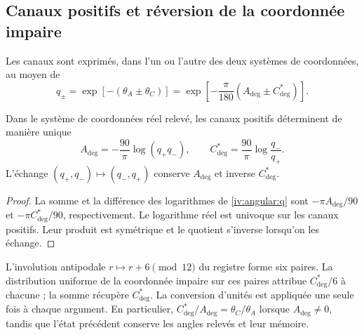 \subsection{Canaux positifs et réversion de la coordonnée impaire
}
\label{iv:angular:canales}

Les canaux sont exprimés, dans l’un ou l’autre des deux systèmes de coordonnées, au moyen de
\begin{equation}
 q_\pm=\exp[-(\theta_A\pm\theta_C)]
 =\exp\!\left[-\frac{\pi}{180}
                   (A_{\deg}\pm C^*_{\deg})\right].
 \label{iv:angular:q}
\end{equation}

\begin{proposition}
\label{iv:angular:inversion}
Dans le système de coordonnées réel relevé, les canaux positifs déterminent
de manière unique
\begin{equation}
 A_{\deg}=-\frac{90}{\pi}\log(q_+q_-),\qquad
 C^*_{\deg}=\frac{90}{\pi}\log\frac{q_-}{q_+}.
 \label{iv:angular:recuperacion}
\end{equation}
L'échange \((q_+,q_-)\mapsto(q_-,q_+)\) conserve
\(A_{\deg}\) et inverse \(C^*_{\deg}\).
\end{proposition}
\begin{proof}
La somme et la différence des logarithmes de
\eqref{iv:angular:q} sont \(-\pi A_{\deg}/90\) et
\(-\pi C^*_{\deg}/90\), respectivement. Le logarithme réel
est univoque sur les canaux positifs. Leur produit est symétrique
et le quotient s’inverse lorsqu’on les échange.

\end{proof}

L’involution antipodale \(r\mapsto r+6\pmod {12}\) du
registre forme six paires. La distribution uniforme de la
coordonnée impaire sur ces paires attribue
\(C^*_{\deg}/6\) à chacune ; la somme récupère
\(C^*_{\deg}\). La conversion d’unités est appliquée une
seule fois à chaque argument. En particulier,
\(C^*_{\deg}/A_{\deg}=\theta_C/\theta_A\) lorsque
\(A_{\deg}\ne0\), tandis que l’état précédent conserve
les angles relevés et leur mémoire.

